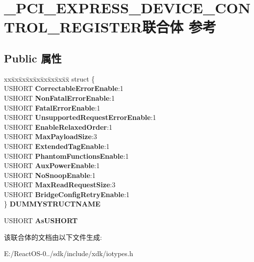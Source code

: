\hypertarget{union___p_c_i___e_x_p_r_e_s_s___d_e_v_i_c_e___c_o_n_t_r_o_l___r_e_g_i_s_t_e_r}{}\section{\+\_\+\+P\+C\+I\+\_\+\+E\+X\+P\+R\+E\+S\+S\+\_\+\+D\+E\+V\+I\+C\+E\+\_\+\+C\+O\+N\+T\+R\+O\+L\+\_\+\+R\+E\+G\+I\+S\+T\+E\+R联合体 参考}
\label{union___p_c_i___e_x_p_r_e_s_s___d_e_v_i_c_e___c_o_n_t_r_o_l___r_e_g_i_s_t_e_r}
\subsection*{Public 属性}
\begin{DoxyCompactItemize}
\item 
\mbox{\label{union___p_c_i___e_x_p_r_e_s_s___d_e_v_i_c_e___c_o_n_t_r_o_l___r_e_g_i_s_t_e_r_a61c2bf5a35939438d20fe9184fcee9bd}} 
\begin{tabbing}
xx\=xx\=xx\=xx\=xx\=xx\=xx\=xx\=xx\=\kill
struct \{\\
\>USHORT {\bfseries CorrectableErrorEnable}:1\\
\>USHORT {\bfseries NonFatalErrorEnable}:1\\
\>USHORT {\bfseries FatalErrorEnable}:1\\
\>USHORT {\bfseries UnsupportedRequestErrorEnable}:1\\
\>USHORT {\bfseries EnableRelaxedOrder}:1\\
\>USHORT {\bfseries MaxPayloadSize}:3\\
\>USHORT {\bfseries ExtendedTagEnable}:1\\
\>USHORT {\bfseries PhantomFunctionsEnable}:1\\
\>USHORT {\bfseries AuxPowerEnable}:1\\
\>USHORT {\bfseries NoSnoopEnable}:1\\
\>USHORT {\bfseries MaxReadRequestSize}:3\\
\>USHORT {\bfseries BridgeConfigRetryEnable}:1\\
\} {\bfseries DUMMYSTRUCTNAME}\\

\end{tabbing}\item 
\mbox{\label{union___p_c_i___e_x_p_r_e_s_s___d_e_v_i_c_e___c_o_n_t_r_o_l___r_e_g_i_s_t_e_r_a6b2756ad9b026ea1b1368ef77b1da5d1}} 
U\+S\+H\+O\+RT {\bfseries As\+U\+S\+H\+O\+RT}
\end{DoxyCompactItemize}


该联合体的文档由以下文件生成\+:\begin{DoxyCompactItemize}
\item 
E\+:/\+React\+O\+S-\/0../sdk/include/xdk/iotypes.\+h\end{DoxyCompactItemize}

